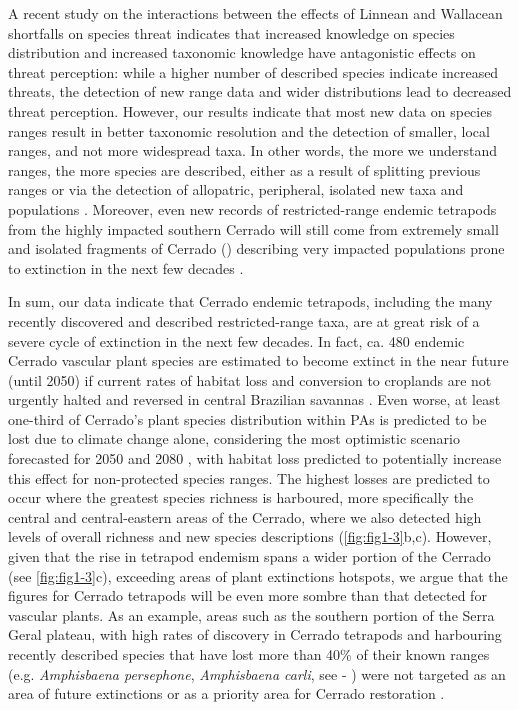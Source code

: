 \documentclass[12pt,openright,oneside,a4paper,english]{abntex2}
\begin{document}
A recent study on the interactions between the effects of Linnean and Wallacean shortfalls on species threat \citep{Baranzelli2023} indicates that increased knowledge on species distribution and increased taxonomic knowledge have antagonistic effects on threat perception: while a higher number of described species indicate increased threats, the detection of new range data and wider distributions lead to decreased threat perception. However, our results indicate that most new data on species ranges result in better taxonomic resolution and the detection of smaller, local ranges, and not more widespread taxa. In other words, the more we understand ranges, the more species are described, either as a result of splitting previous ranges or via the detection of allopatric, peripheral, isolated new taxa and populations \citep{Nogueira2011, Azevedo2016}. Moreover, even new records of restricted-range endemic tetrapods from the highly impacted southern Cerrado will still come from extremely small and isolated fragments of Cerrado (\citealp[see][]{Serrano2023}) describing very impacted populations prone to extinction in the next few decades \citep{Strassburg2017}.

In sum, our data indicate that Cerrado endemic tetrapods, including the many recently discovered and described restricted-range taxa, are at great risk of a severe cycle of extinction in the next few decades. In fact, ca. 480 endemic Cerrado vascular plant species are estimated to become extinct in the near future (until 2050) if current rates of habitat loss and conversion to croplands are not urgently halted and reversed in central Brazilian savannas \citep{Strassburg2017}. Even worse, at least one-third of Cerrado’s plant species distribution within PAs is predicted to be lost due to climate change alone, considering the most optimistic scenario forecasted for 2050 and 2080 \citep{Velazco2019}, with habitat loss predicted to potentially increase this effect for non-protected species ranges. The highest losses are predicted to occur where the greatest species richness is harboured, more specifically the central and central-eastern areas of the Cerrado, where we also detected high levels of overall richness and new species descriptions (\autoref{fig:fig1-3}b,c). However, given that the rise in tetrapod endemism spans a wider portion of the Cerrado (see \autoref{fig:fig1-3}c), exceeding areas of plant extinctions hotspots, we argue that the figures for Cerrado tetrapods will be even more sombre than that detected for vascular plants. As an example, areas such as the southern portion of the Serra Geral plateau, with high rates of discovery in Cerrado tetrapods and harbouring recently described species that have lost more than 40\% of their known ranges (e.g. \textit{Amphisbaena persephone}, \textit{Amphisbaena carli}, see  - ) were not targeted as an area of future extinctions or as a priority area for Cerrado restoration \citep{Strassburg2017}.
\end{document}
